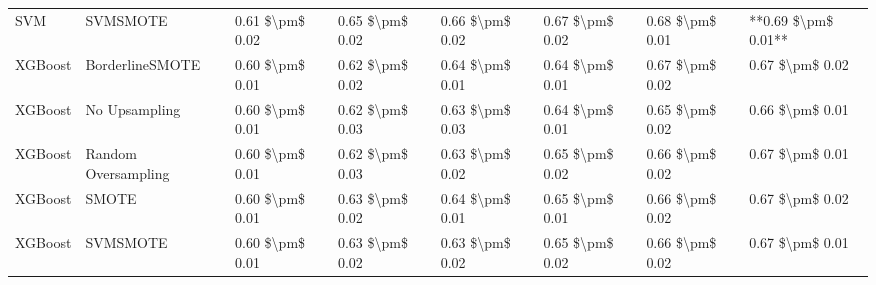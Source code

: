\begin{tabular}{llllllll}
                            SVM &                      SVMSMOTE & 0.61 \$\textbackslash pm\$ 0.02 &           0.65 \$\textbackslash pm\$ 0.02 &       0.66 \$\textbackslash pm\$ 0.02 &        0.67 \$\textbackslash pm\$ 0.02 &                         0.68 \$\textbackslash pm\$ 0.01 & **0.69 \$\textbackslash pm\$ 0.01** \\
                        XGBoost &               BorderlineSMOTE & 0.60 \$\textbackslash pm\$ 0.01 &           0.62 \$\textbackslash pm\$ 0.02 &       0.64 \$\textbackslash pm\$ 0.01 &        0.64 \$\textbackslash pm\$ 0.01 &                         0.67 \$\textbackslash pm\$ 0.02 &     0.67 \$\textbackslash pm\$ 0.02 \\
                        XGBoost &                 No Upsampling & 0.60 \$\textbackslash pm\$ 0.01 &           0.62 \$\textbackslash pm\$ 0.03 &       0.63 \$\textbackslash pm\$ 0.03 &        0.64 \$\textbackslash pm\$ 0.01 &                         0.65 \$\textbackslash pm\$ 0.02 &     0.66 \$\textbackslash pm\$ 0.01 \\
                        XGBoost &           Random Oversampling & 0.60 \$\textbackslash pm\$ 0.01 &           0.62 \$\textbackslash pm\$ 0.03 &       0.63 \$\textbackslash pm\$ 0.02 &        0.65 \$\textbackslash pm\$ 0.02 &                         0.66 \$\textbackslash pm\$ 0.02 &     0.67 \$\textbackslash pm\$ 0.01 \\
                        XGBoost &                         SMOTE & 0.60 \$\textbackslash pm\$ 0.01 &           0.63 \$\textbackslash pm\$ 0.02 &       0.64 \$\textbackslash pm\$ 0.01 &        0.65 \$\textbackslash pm\$ 0.01 &                         0.66 \$\textbackslash pm\$ 0.02 &     0.67 \$\textbackslash pm\$ 0.02 \\
                        XGBoost &                      SVMSMOTE & 0.60 \$\textbackslash pm\$ 0.01 &           0.63 \$\textbackslash pm\$ 0.02 &       0.63 \$\textbackslash pm\$ 0.02 &        0.65 \$\textbackslash pm\$ 0.02 &                         0.66 \$\textbackslash pm\$ 0.02 &     0.67 \$\textbackslash pm\$ 0.01 \\
\bottomrule
\end{tabular}
